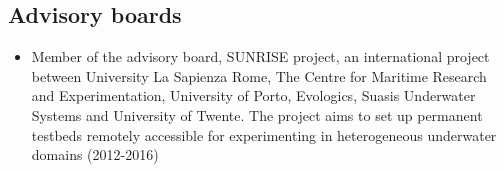 
\subsection*{Advisory boards}

\begin{itemize}

\item Member of the advisory board, SUNRISE project, an international project between University La Sapienza Rome, The Centre for Maritime Research and Experimentation, University of Porto,  Evologics, Suasis Underwater Systems and University of Twente. The project aims to set up permanent testbeds remotely accessible for experimenting in heterogeneous underwater domains (2012-2016)

\end{itemize}
